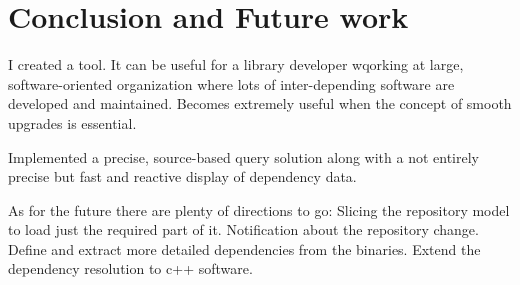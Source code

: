 \chapter{Conclusion and Future work}

I created a tool.
It can be useful for a library developer wqorking at large, software-oriented
organization where lots of inter-depending software are developed and
maintained.
Becomes extremely useful when the concept of smooth upgrades is essential.

Implemented a precise, source-based  query solution along with a not entirely
precise but fast and reactive display of dependency data.

As for the future there are plenty of directions to go:
Slicing the repository model to load just the required part of it.
Notification about the repository change.
Define and extract more detailed dependencies from the binaries.
Extend the dependency resolution to c++ software.
